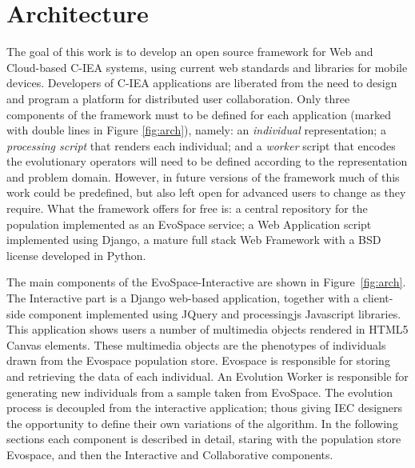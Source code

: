 \documentclass{sig-alternate}
\begin{document}
\section{Architecture}
The goal of this work is to develop an open source framework for Web and Cloud-based C-IEA systems,
using current web standards and libraries for mobile devices. 
Developers of C-IEA applications are liberated from the need to design and program a platform for distributed user collaboration.
Only three components of the framework  must to be defined for each
application (marked with double lines in Figure \ref{fig:arch}), namely: an \emph{individual} representation; a \emph{processing script} that renders each individual; and a \emph{worker} script that encodes the evolutionary operators will need to be defined according to the representation and problem domain.
However, in future versions of the framework much of this work could be predefined, but also left open for advanced users to change as they require.
What the framework offers for free is: a central repository for the population implemented as an EvoSpace service; a Web Application script implemented using Django, a mature full stack Web Framework with a BSD license developed in Python.


The main components of the EvoSpace-Interactive are shown in Figure~\ref{fig:arch}. The Interactive part is a Django \cite{} web-based application, together with a client-side component implemented using JQuery and processingjs Javascript libraries. This application shows users a number of multimedia objects rendered in HTML5 Canvas elements. These multimedia objects are the phenotypes of individuals drawn from the Evospace population store. Evospace is responsible for storing and retrieving the data of each individual. An Evolution Worker is responsible for generating new individuals from a sample taken from EvoSpace. The evolution process is decoupled from the interactive application; thous giving IEC designers the opportunity to define their own variations of the algorithm. In the following sections each component is described in detail, staring with the population store Evospace, and then the Interactive and Collaborative components.     
\end{document}
